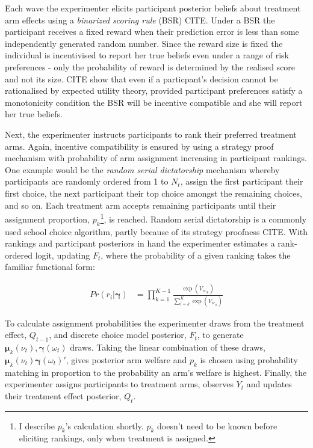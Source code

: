 \documentclass[twoside,11pt]{article}
\begin{document}
Each wave the experimenter elicits participant posterior beliefs about treatment 
arm effects using a \textit{binarized scoring rule} (BSR) CITE. Under a BSR the participant 
receives a fixed reward when their prediction error is less than some independently 
generated random number. Since the reward size is fixed the individual is 
incentivised to report her true beliefs even under a range of risk preferences - only the 
probability of reward is determined by the realised score and not its size. CITE 
show that even if a particpant's decision cannot be rationalised by expected 
utility theory, provided participant preferences satisfy a monotonicity condition 
the BSR will be incentive compatible and she will report her true beliefs.

Next, the experimenter instructs participants to rank their preferred treatment 
arms. Again, incentive compatibility is ensured by using a strategy proof mechanism
with probability of arm assignment increasing in participant rankings. One example 
would be the \textit{random serial dictatorship} mechanism whereby participants 
are randomly ordered from 1 to $N_t$, assign the first participant their first choice,
the next participant their top choice amongst the remaining choices, and so on. 
Each treatment arm accepts remaining participants until their assignment proportion, 
$p_k$\footnote{I describe $p_k$'s calculation shortly. $p_k$ doesn't need to be known 
before eliciting rankings, only when treatment is assigned.}, is reached. Random 
serial dictatorship is a commonly used school choice algorithm, partly because of 
its strategy proofness CITE.  With rankings 
and participant posteriors in hand the experimenter estimates a rank-ordered logit, 
updating $F_t$, 
where the probability of a given ranking takes the familiar functional form:

\begin{align*}
  Pr(r_i | \bm{\gamma}) &= \prod^{K-1}_{k=1} \frac{\exp(V_{ir_{ik}})}{\sum^K_{l=k}\exp(V_{ir_{il}})}
\end{align*}


To calculate assignment probabilities the experimenter draws from the treatment
effect, $Q_{t-1}$, and discrete choice model posterior, $F_t$, to generate $\bm{\mu}_k(\nu_t), \bm{\gamma}(\omega_t)$ 
draws. Taking the linear combination of these draws, 
$\bm{\mu}_k(\nu_{t}) \bm{\gamma}(\omega_{t})'$, gives posterior arm welfare and 
$p_k$ is chosen using probability matching in proportion to the probability an 
arm's welfare is highest. Finally, the experimenter assigns participants to 
treatment arms, observes $Y_t$ and updates their treatment effect posterior, $Q_t$.
\end{document}

